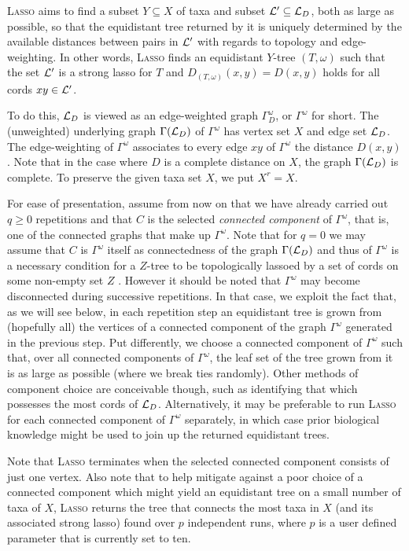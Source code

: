 \textsc{Lasso} aims to find a subset $Y \subseteq X$ of taxa and subset ${\mathcal L}'
\subseteq {\mathcal L}_D$, both as large as possible, so that the equidistant tree
returned by it is uniquely determined by the available distances between pairs
in ${\mathcal L}'$ with regards to topology and edge-weighting.  In other words,
\textsc{Lasso} finds an equidistant $Y$-tree $(T,\omega) $ such that the set
${\mathcal L}'$ is a strong lasso for $T$ and $D_{(T,\omega)}(x,y) =D(x,y)$ holds for
all cords $xy\in {\mathcal L}'$.

To do this, ${\mathcal L}_D$ is viewed as an edge-weighted graph $\Gamma_D^{\omega}$,
or $\Gamma^{\omega}$ for short. The (unweighted) underlying graph
$\Gamma({\mathcal L}_D)$ of $\Gamma^{\omega}$ has vertex set $X$ and edge set
${\mathcal L}_D$. The edge-weighting of $\Gamma^{\omega}$ associates to every edge $xy$
of $\Gamma^{\omega}$ the distance $D(x,y)$.  Note that in the case where $D$
is a complete distance on $X$, the graph $\Gamma({\mathcal L}_D)$ is complete.  To
preserve the given taxa set $X$, we put $X^r=X$.

For ease of presentation, assume from now on that we have already carried out
$q\geq 0$ repetitions and that $C$ is the selected {\em connected component}
of $\Gamma^{\omega}$, that is, one of the connected graphs that make up
$\Gamma^{\omega}$.  Note that for $q=0$ we may assume that $C$ is
$\Gamma^{\omega}$ itself as connectedness of the graph $\Gamma({\mathcal L}_D)$ and
thus of $\Gamma^{\omega}$ is a necessary condition for a $Z$-tree to be
topologically lassoed by a set of cords on some non-empty set $Z$
\cite{huber13lassoing}.  However it should be noted that $\Gamma^{\omega}$ may
become disconnected during successive repetitions.  In that case, we exploit
the fact that, as we will see below, in each repetition step an equidistant
tree is grown from (hopefully all) the vertices of a connected component of
the graph $\Gamma^{\omega}$ generated in the previous step. Put differently,
we choose a connected component of $\Gamma^{\omega}$ such that, over all
connected components of $\Gamma^{\omega}$, the leaf set of the tree grown from
it is as large as possible (where we break ties randomly). Other methods of
component choice are conceivable though, such as identifying that which
possesses the most cords of ${\mathcal L}_D$.  Alternatively, it may be preferable to
run \textsc{Lasso} for each connected component of $\Gamma^{\omega}$
separately, in which case prior biological knowledge might be used to join up
the returned equidistant trees.

Note that \textsc{Lasso} terminates when the selected connected component
consists of just one vertex.  Also note that to help mitigate against a poor
choice of a connected component which might yield an equidistant tree on a
small number of taxa of $X$, \textsc{Lasso} returns the tree that connects the
most taxa in $X$ (and its associated strong lasso) found over $p$ independent
runs, where $p$ is a user defined parameter that is currently set to ten.

